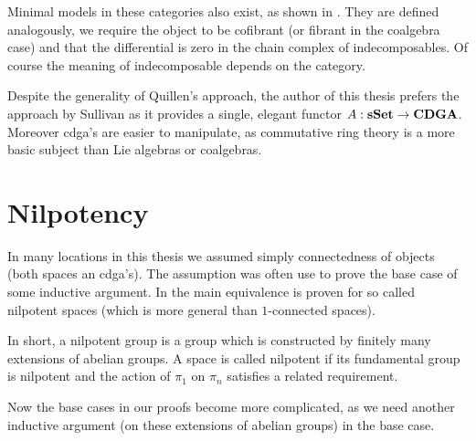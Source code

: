 Minimal models in these categories also exist, as shown in \cite{neisendorfer}. They are defined analogously, we require the object to be cofibrant (or fibrant in the coalgebra case) and that the differential is zero in the chain complex of indecomposables. Of course the meaning of indecomposable depends on the category.

Despite the generality of Quillen's approach, the author of this thesis  prefers the approach by Sullivan as it provides a single, elegant functor $A: \mathbf{s{\mathbf{Set}}} \to \mathbf{CDGA}$. Moreover cdga's are easier to manipulate, as commutative ring theory is a more basic subject than Lie algebras or coalgebras.


\section{Nilpotency}
In many locations in this thesis we assumed simply connectedness of objects (both spaces an cdga's). The assumption was often use to prove the base case of some inductive argument. In \cite{bousfield} the main equivalence is proven for so called nilpotent spaces (which is more general than $1$-connected spaces).

In short, a nilpotent group is a group which is constructed by finitely many extensions of abelian groups. A space is called nilpotent if its fundamental group is nilpotent and the action of $\pi_1$ on $\pi_n$ satisfies a related requirement.

Now the base cases in our proofs become more complicated, as we need another inductive argument (on these extensions of abelian groups) in the base case.

